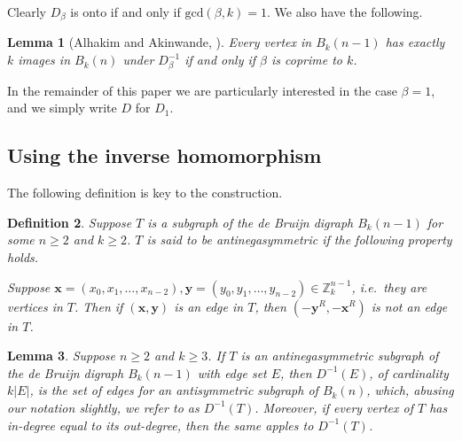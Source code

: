 \documentclass[a4paper,11pt]{article}
\newtheorem{lemma}{Lemma}[section]
\newtheorem{definition}[lemma]{Definition}
\begin{document}
Clearly $D_{\beta}$ is onto if and only if $\text{gcd}(\beta,k) = 1$.  We also have the following.

\begin{lemma}[Alhakim and Akinwande, \cite{Alhakim11}]
Every vertex in $B_{k}(n-1)$ has exactly $k$ images in $B_k(n)$ under $D_{\beta}^{-1}$ if and only
if $\beta$ is coprime to $k$.
\end{lemma}

In the remainder of this paper we are particularly interested in the case $\beta=1$, and we simply
write $D$ for $D_1$.

\subsection{Using the inverse homomorphism}

The following definition is key to the construction.

\begin{definition}
Suppose $T$ is a subgraph of the de Bruijn digraph $B_{k}(n-1)$ for some $n\geq2$ and $k\geq2$.
$T$ is said to be \emph{antinegasymmetric} if the following property holds.

Suppose $\mathbf{x}=(x_0,x_1,\ldots,x_{n-2}),\mathbf{y}=(y_0,y_1,\ldots,y_{n-2})\in
\mathbb{Z}_k^{n-1}$, i.e.\ they are vertices in $T$.  Then if $(\mathbf{x},\mathbf{y})$ is an
edge in $T$, then $(-\mathbf{y}^R,-\mathbf{x}^R)$ is not an edge in $T$.
\end{definition}

\begin{lemma}  \label{lemma:Lempel_antisymmetry}
Suppose $n\geq2$ and $k\geq3$.  If $T$ is an antinegasymmetric subgraph of the de Bruijn
digraph $B_{k}(n-1)$ with edge set $E$, then $D^{-1}(E)$, of cardinality $k|E|$, is the set of
edges for an antisymmetric subgraph of $B_{k}(n)$, which, abusing our notation slightly, we
refer to as $D^{-1}(T)$. Moreover, if every vertex of $T$ has in-degree equal to its
out-degree, then the same apples to $D^{-1}(T)$.
\end{lemma}
\end{document}
